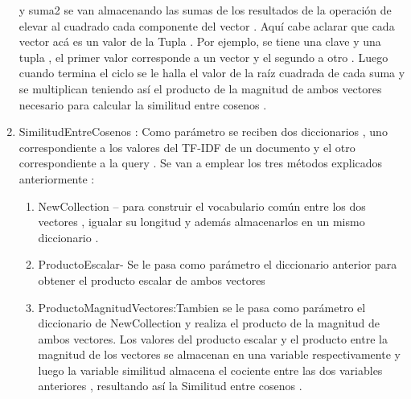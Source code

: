 \documentclass[10pt]{extarticle}
\begin{document}
\begin{enumerate}
	y suma2 se van almacenando las sumas de los resultados de la operación de elevar al cuadrado 
	cada componente del vector . Aquí cabe aclarar que cada vector acá es un valor de la Tupla . Por 
	ejemplo, se tiene una clave y una tupla , el primer valor corresponde a un vector y el segundo a 
	otro . Luego cuando termina el ciclo se le halla el valor de la raíz cuadrada de cada suma y se 
	multiplican teniendo así el producto de la magnitud de ambos vectores necesario para calcular la 
	similitud entre cosenos . 
	\item SimilitudEntreCosenos : Como parámetro se reciben dos diccionarios , uno 
	correspondiente a los valores del TF-IDF de un documento y el otro correspondiente a la query . Se 
	van a emplear los tres métodos explicados anteriormente : 
	\begin{enumerate}
		\item NewCollection – para construir el vocabulario común entre los dos vectores , igualar su longitud 
		y además almacenarlos en un mismo diccionario . 
		\item ProductoEscalar- Se le pasa como parámetro el diccionario anterior para obtener el producto 
		escalar de ambos vectores 
		\item 	ProductoMagnitudVectores:Tambien se le pasa como parámetro el diccionario de NewCollection 
		y realiza el producto de la magnitud de ambos vectores. 
		Los valores del producto escalar y el producto entre la magnitud de los vectores se almacenan en 
		una variable respectivamente y luego la variable similitud almacena el cociente entre las dos 
		variables anteriores , resultando así la Similitud entre cosenos . 
	\end{enumerate}
 

\end{enumerate}
\end{document}
